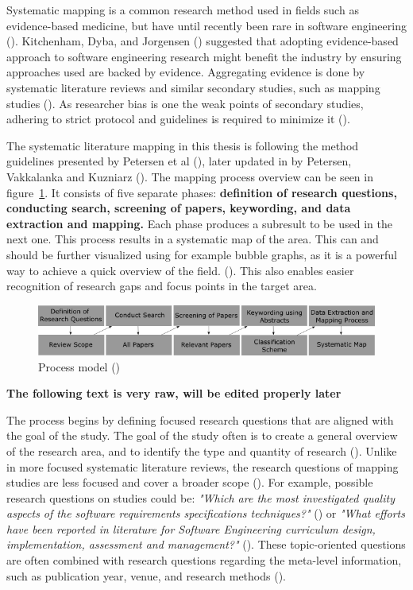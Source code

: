 \documentclass[utf8,english]{gradu3}
\begin{document}
Systematic mapping is a common research method used in fields such as
evidence-based medicine, but have until recently been rare in software
engineering (\cite{petersen2008}). Kitchenham, Dyba, and Jorgensen
(\cite*{kitchenham2004}) suggested that adopting evidence-based approach to
software engineering research might benefit the industry by ensuring approaches
used are backed by evidence. Aggregating evidence is done by systematic
literature reviews and similar secondary studies, such as mapping studies
(\cite{kitchenham2010}). As researcher bias is one the weak points of secondary
studies, adhering to strict protocol and guidelines is required to minimize it
(\cite{brereton2007}).


The systematic literature mapping in this thesis is following the method
guidelines presented by Petersen et al (\cite*{petersen2008}), later updated in
by Petersen, Vakkalanka and Kuzniarz (\cite*{petersen2015}). The mapping process
overview can be seen in figure~\ref{fig:mapping}. It consists of five separate
phases: \textbf{definition of research questions, conducting search, screening
of papers, keywording, and data extraction and mapping.} Each phase produces a
subresult to be used in the next one. This process results in a systematic map
of the area. This can and should be further visualized using for example bubble
graphs, as it is a powerful way to achieve a quick overview of the field.
(\cite{petersen2008}). This also enables easier recognition of research gaps and
focus points in the target area.


\begin{figure}[h]
  \includegraphics[width=\linewidth]{images/method_graph_L.png}
  \caption{Process model (\cite{petersen2008})}
  \label{fig:mapping}
\end{figure}

\textbf{The following text is very raw, will be edited properly later}

The process begins by defining focused research questions that are aligned with
the goal of the study. The goal of the study often is to create a general
overview of the research area, and to identify the type and quantity of research
(\cite{petersen2008}). Unlike in more focused systematic literature reviews, the
research questions of mapping studies are less focused and cover a broader scope
(\cite{kitchenham2010}). For example, possible research questions on studies
could be: \emph{"Which are the most investigated quality aspects of the software
requirements specifications techniques?"} (\cite{condori2009}) or \emph{"What
efforts have been reported in literature for Software Engineering curriculum
design, implementation, assessment and management?"} (\cite{qadir2011}). These
topic-oriented questions are often combined with research questions regarding
the meta-level information, such as publication year, venue, and research
methods (\cite{petersen2015}).
\end{document}
